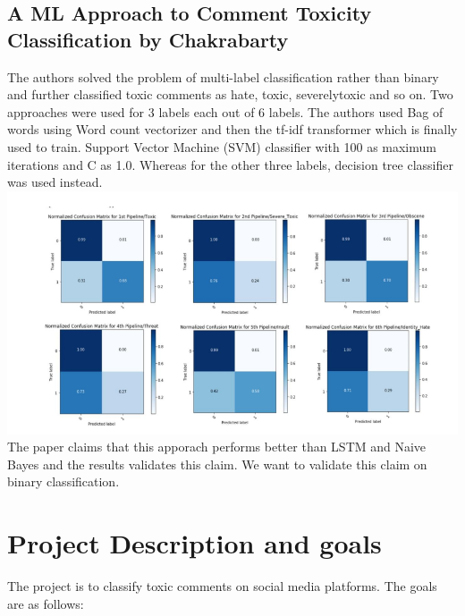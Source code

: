 \documentclass[11pt]{article}
\begin{document}
\subsection{A ML Approach to Comment Toxicity Classification by Chakrabarty}
The authors solved the problem of multi-label 
classification rather than binary and further classified toxic comments as hate, toxic, severelytoxic and so on. 
Two approaches were used for 3 labels each out of 6 labels. 
The authors used Bag of words using Word count vectorizer and then the tf-idf transformer which is finally used to train. Support Vector Machine (SVM) classifier with 100 as maximum iterations and C as 1.0. Whereas for the other three labels, decision tree classifier was used instead.
\\
\includegraphics[scale=0.9]{figs/chakra_all.png}
\\
The paper claims that this apporach performs better than
 LSTM and Naive Bayes and the results validates this claim. 
 We want to validate this claim on binary classification.
\section{Project Description and goals}
The project is to classify toxic comments on social media platforms. The goals are as follows:
\end{document}
